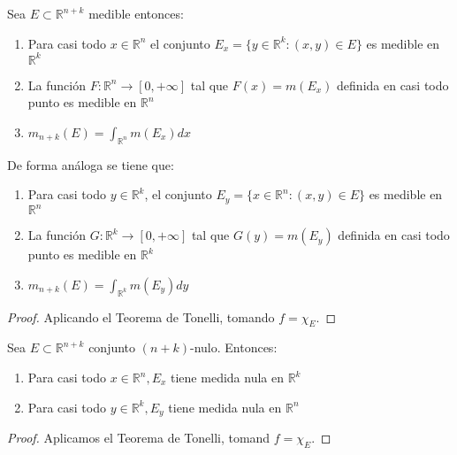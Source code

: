 \begin{corolario}
    Sea $E \subset \mathbb{R}^{n+k}$ medible entonces:
    \begin{enumerate}
        \item Para casi todo $x \in \mathbb{R}^n$ el conjunto $E_x = \{ y \in \mathbb{R}^k :
                  (x, y) \in E \}$ es medible en $\mathbb{R}^k$
        \item La función $F: \mathbb{R}^n \to [0, +\infty]$ tal que $F(x) = m(E_x)$ definida
              en casi todo punto es medible en $\mathbb{R}^n$
        \item $m_{n+k}(E) = \int_{\mathbb{R}^n}m(E_x)dx$
    \end{enumerate}
    De forma análoga se tiene que:
    \begin{enumerate}
        \item Para casi todo $y \in \mathbb{R}^k$, el conjunto $E_y = \{ x \in \mathbb{R}^n :
                  (x, y) \in E \}$ es medible en $\mathbb{R}^n$
        \item La función $G: \mathbb{R}^k \to [0, +\infty]$ tal que $G(y) = m(E_y)$ definida
              en casi todo punto es medible en $\mathbb{R}^k$
        \item $m_{n+k}(E) = \int_{\mathbb{R}^k}m(E_y)dy$
    \end{enumerate}
\end{corolario}
\begin{proof}
    Aplicando el Teorema de Tonelli, tomando $f = \chi_E$.
\end{proof}
\begin{corolario}
    Sea $E \subset \mathbb{R}^{n+k}$ conjunto $(n+k)$-nulo. Entonces: 
    \begin{enumerate}
        \item Para casi todo $x \in \mathbb{R}^n, E_x$ tiene medida nula en $\mathbb{R}^k$
        \item Para casi todo $y \in \mathbb{R}^k, E_y$ tiene medida nula en $\mathbb{R}^n$
    \end{enumerate}
\end{corolario}
\begin{proof}
    Aplicamos el Teorema de Tonelli, tomand $f = \chi_E$.
\end{proof}
